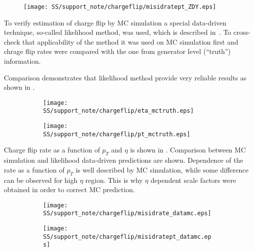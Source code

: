 \begin{figure}
\begin{center}
 \texttt{[image: SS/support\_note/chargeflip/misidratept\_ZDY.eps]}
\caption{\toDo[caption]}
\label{fig:chargeFlip_structure}
\end{center}
\end{figure}

To verify estimation of charge flip by MC simulation a special data-driven technique, so-called likelihood method, was used, which is described in~\cite{same_sign_paper_7tev}. To cross-check that applicability of the method it was used on 
MC simulation first and chrage flip rates were compared with the one from generator level (``truth'') information. 

Comparison demonstrates that likelihood method provide very reliable results as shown in
.

\begin{figure}
\begin{subfigure}{.5\textwidth}
  \centering
  \texttt{[image: SS/support\_note/chargeflip/eta\_mctruth.eps]}
\end{subfigure}%
\begin{subfigure}{.5\textwidth}
  \centering
  \texttt{[image: SS/support\_note/chargeflip/pt\_mctruth.eps]}
\end{subfigure}
\caption{\toDo}
\label{fig:likelihood_cross_check}
\end{figure}

Charge flip rate as a function of $p_T$ and $\eta$ is shown in .
Comparison between MC simulation and likelihood data-driven predictions are shown. 
Dependence of the rate as a function of $p_T$ is well described by MC simulation, while some difference can be observed
for high $\eta$ region. This is why $\eta$ dependent scale factors were obtained in order to correct MC prediction.

\begin{figure}
\begin{subfigure}{.5\textwidth}
  \centering
  \texttt{[image: SS/support\_note/chargeflip/misidrate\_datamc.eps]}
\end{subfigure}%
\begin{subfigure}{.5\textwidth}
  \centering
  \texttt{[image: SS/support\_note/chargeflip/misidratept\_datamc.eps]}
\end{subfigure}
\caption{\toDo}
\label{fig:charge_flip_data_vs_mc}
\end{figure}


